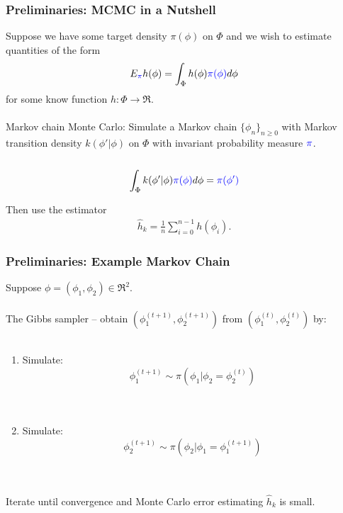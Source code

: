 \documentclass[xcolor=dvipsnames]{beamer}
\begin{document}
\begin{frame}
\frametitle{Preliminaries: MCMC in a Nutshell}
Suppose we have some target density {\color{blue} $\pi(\phi)$} on $\Phi$ and we wish to estimate quantities of the form 
\begin{align*}
E_{\color{blue}\pi} h(\phi) = \int_{\Phi} h(\phi){\color{blue}\pi(\phi)}d\phi
\end{align*}
for some know function $h:\Phi\to\Re$.\\~\\

\pause Markov chain Monte Carlo: Simulate a Markov chain $\{\phi_n\}_{n\geq 0}$ with Markov transition density $k(\phi'|\phi)$ on $\Phi$ with invariant probability measure ${\color{blue}\pi}$.\\~\\

\[
\int_{\Phi}k(\phi'|\phi){\color{blue}\pi(\phi)}d\phi = {\color{blue}\pi(\phi')}
\]


\pause Then use the estimator
\begin{align*}
\hat{h}_k=\frac{1}{n}\sum_{i=0}^{n-1}h(\phi_i).
\end{align*}

\end{frame}

\begin{frame}
\frametitle{Preliminaries: Example Markov Chain}
Suppose $\phi=(\phi_1,\phi_2)\in\Re^2$.\\~\\

The Gibbs sampler -- obtain $(\phi_1^{(t+1)},\phi_2^{(t+1)})$ from $(\phi_1^{(t)},\phi_2^{(t)})$ by:\\~\\
\begin{enumerate}
\item Simulate:
\[
\phi_1^{(t + 1)} \sim \pi(\phi_1|\phi_2=\phi_2^{(t)})
\]
\\~\\
\item Simulate:
\[
\phi_2^{(t + 1)} \sim \pi(\phi_2|\phi_1=\phi_1^{(t+1)})
\]\\~\\
\end{enumerate}
Iterate until convergence and Monte Carlo error estimating $\hat{h}_k$ is small.
\end{frame}
\end{document}
